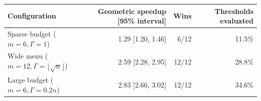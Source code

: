 \begin{tabular}{lrrr}
\toprule
Configuration & Geometric speedup [95\% interval] & Wins & Thresholds evaluated \\
\midrule
Sparse budget ($m=6,\Gamma=1$) & 1.29 [1.20, 1.46] & 6/12 & 11.5\% \\
Wide menu ($m=12,\Gamma=\lfloor\sqrt n\rfloor$) & 2.59 [2.28, 2.95] & 12/12 & 28.8\% \\
Large budget ($m=6,\Gamma=0.2n$) & 2.83 [2.66, 3.02] & 12/12 & 34.6\% \\
\bottomrule
\end{tabular}

